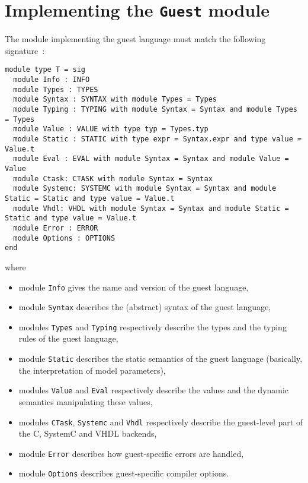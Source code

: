 \section{Implementing the \texttt{Guest} module}

The module implementing the guest language must match the following signature~:

\begin{lstlisting}[language={[Objective]Caml},frame=single,basicstyle=\small,label={lst:guest-sig}]
module type T = sig
  module Info : INFO
  module Types : TYPES
  module Syntax : SYNTAX with module Types = Types
  module Typing : TYPING with module Syntax = Syntax and module Types = Types
  module Value : VALUE with type typ = Types.typ
  module Static : STATIC with type expr = Syntax.expr and type value = Value.t
  module Eval : EVAL with module Syntax = Syntax and module Value = Value
  module Ctask: CTASK with module Syntax = Syntax
  module Systemc: SYSTEMC with module Syntax = Syntax and module Static = Static and type value = Value.t
  module Vhdl: VHDL with module Syntax = Syntax and module Static = Static and type value = Value.t
  module Error : ERROR
  module Options : OPTIONS
end
\end{lstlisting}

\noindent
where
\begin{itemize}
\item module \texttt{Info} gives the name and version of the guest language,
\item module \texttt{Syntax} describes the (abstract) syntax of the guest language,
\item modules \texttt{Types} and \texttt{Typing} respectively describe the types and the typing
  rules of the guest language,
\item module \texttt{Static} describes the static semantics of the guest language (basically, the
  interpretation of model parameters),
\item modules \texttt{Value} and \texttt{Eval} respectively describe the values and the dynamic
  semantics manipulating these values,
\item modules \texttt{CTask}, \texttt{Systemc} and \texttt{Vhdl} respectively describe the
  guest-level part of the C, SystemC and VHDL backends,
\item module \texttt{Error} describes how guest-specific errors are handled,
\item module \texttt{Options} describes guest-specific compiler options.
\end{itemize}

